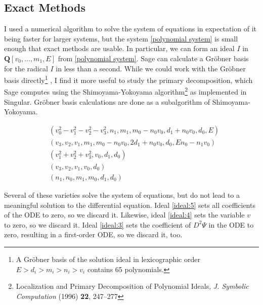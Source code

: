 \documentclass{article}
\begin{document}
\subsection*{Exact Methods}

I used a numerical algorithm to solve the system of equations in expectation
of it being faster for larger systems, but the system \eqref{polynomial system}
is small enough that exact methods are usable.  In particular, we can form
an ideal $I$ in $\mathbf{Q}[v_0,...,m_1,E]$ from \eqref{polynomial system}.
Sage can calculate a Gr\"obner basis for the radical $I$ in less than a second.
While we could work with the Gr\"obner basis directly\footnote{A Gr\"obner basis
of the solution ideal in lexicographic order $E>d_i>m_i>n_i>v_i$ contains 65 polynomials.}
, I find it more
useful to study the primary decomposition, which Sage computes using
the Shimoyama-Yokoyama algorithm\footnote{Localization and Primary Decomposition of
Polynomial Ideals, {\it J. Symbolic Computation} (1996) {\bf 22}, 247–277}
as implemented in Singular.  Gr\"obner basis calculations are done
as a subalgorithm of Shimoyama-Yokoyama.

\begin{subequations}
\begin{align}
& \left(v_{0}^{2} - v_{1}^{2} - v_{2}^{2} - v_{3}^{2}, n_{1}, m_{1}, m_{0} - n_{0} v_{0}, d_{1} + n_{0} v_{0}, d_{0}, E\right)\label{ideal:1} \\
& \left(v_{3}, v_{2}, v_{1}, m_{1}, m_{0} - n_{0} v_{0}, 2 d_{1} + n_{0} v_{0}, d_{0}, E n_{0} - n_{1} v_{0}\right)\label{ideal:2}\\
& \left(v_{1}^{2} + v_{2}^{2} + v_{3}^{2}, v_{0}, d_{1}, d_{0}\right)\label{ideal:3}\\
& \left(v_{3}, v_{2}, v_{1}, v_{0}, d_{0}\right)\label{ideal:4}\\
& \left(n_{1}, n_{0}, m_{1}, m_{0}, d_{1}, d_{0}\right)\label{ideal:5}
\end{align}
\end{subequations}

Several of these varieties solve the system of equations, but do not lead to a meaningful solution to the differential equation.
Ideal \eqref{ideal:5} sets all coefficients of the ODE to zero, so we discard it.  Likewise, ideal \eqref{ideal:4} sets the variable $v$ to zero, so we discard it.  Ideal \eqref{ideal:3} sets the coefficient of
$D^2\Psi$
in the ODE to zero, resulting in a first-order ODE, so we discard it, too.
\end{document}

